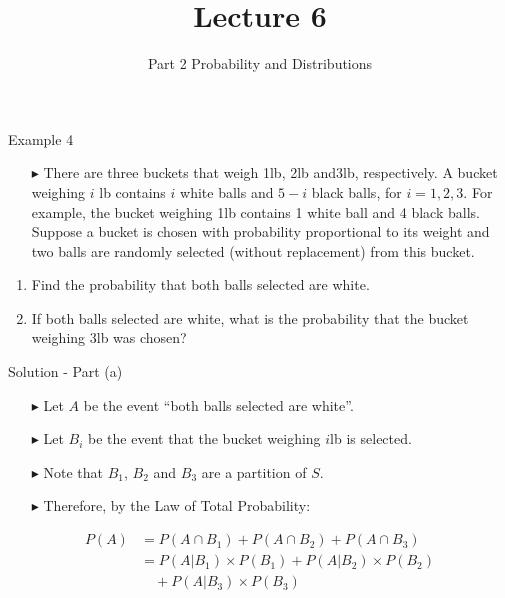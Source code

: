 \documentclass[12pt]{beamer}
\title[ECON2843]{Lecture 6}
\subtitle{Part 2 Probability and Distributions}
\date{}
\begin{document}
	\begin{frame}
		\titlepage
	\end{frame}
	\begin{frame}{Example 4}
		\begin{itemize}
			\item[\color{blue}$\blacktriangleright$] There are three buckets that weigh 1lb, 2lb and3lb, respectively. A bucket weighing $i$ lb contains $i$ white balls and $5 - i$ black balls, for $i = 1,2,3$. For example, the bucket weighing 1lb contains 1 white ball and 4 black balls. Suppose a bucket is chosen with probability proportional to its weight and two balls are randomly selected (without replacement) from this bucket.
		\end{itemize}
		\begin{enumerate}[label=\textcolor{blue}{(\alph*)}]
			\item Find the probability that both balls selected are white.
			\item If both balls selected are white, what is the probability that the bucket weighing 3lb was chosen?
		\end{enumerate}
		
\end{frame}
\begin{frame}{Solution - Part (a)}
\begin{itemize}
	\item[\color{blue}$\blacktriangleright$] Let $A$ be the event ``both balls selected are white''.
	\item[\color{blue}$\blacktriangleright$] Let $B_i$ be the event that the bucket weighing $i$lb is selected.
	\item[\color{blue}$\blacktriangleright$] Note that $B_1$, $B_2$ and $B_3$ are a partition of $S$.
	\item[\color{blue}$\blacktriangleright$] Therefore, by the Law of Total Probability:
\end{itemize}

\begin{align*}
	P(A) &= P(A \cap B_1) + P(A \cap B_2) + P(A \cap B_3) \\
	&= P(A|B_1) \times P(B_1) + P(A|B_2) \times P(B_2) \\
	&\quad + P(A|B_3) \times P(B_3)
\end{align*}
\end{frame}
\end{document}
